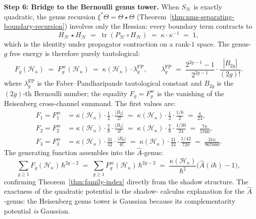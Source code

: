 \begin{computation}
\medskip
\noindent\textbf{Step 6: Bridge to the Bernoulli genus tower.}
When $S_{\mathcal{H}}$ is exactly quadratic, the genus recursion
$\xi^*\Theta = \Theta \star \Theta$
(Theorem~\ref{thm:nms-separating-boundary-recursion}) involves only
the Hessian: every boundary term contracts to
\begin{equation}\label{eq:heisenberg-hessian-contraction}
 H_{\mathcal{H}} \star H_{\mathcal{H}}
 \;=\;
 \operatorname{tr}(P_{\mathcal{H}} \circ H_{\mathcal{H}})
 \;=\;
 \kappa \cdot \kappa^{-1}
 \;=\; 1,
\end{equation}
which is the identity under propagator contraction on a rank-$1$
space. The genus-$g$ free energy is therefore purely tautological:
\begin{equation}\label{eq:heisenberg-genus-g-tautological}
 F_g(\mathcal{H}_\kappa)
 \;=\;
 F_g^{\mathrm{sc}}(\mathcal{H}_\kappa)
 \;=\;
 \kappa(\mathcal{H}_\kappa) \cdot \lambda_g^{\mathrm{FP}},
 \qquad
 \lambda_g^{\mathrm{FP}}
 \;=\;
 \frac{2^{2g-1}-1}{2^{2g-1}} \cdot \frac{|B_{2g}|}{(2g)!}.
\end{equation}
where $\lambda_g^{\mathrm{FP}}$ is the Faber--Pandharipande
tautological constant and $B_{2g}$ is the $(2g)$-th Bernoulli
number; the equality \(F_g=F_g^{\mathrm{sc}}\) is the vanishing of the
Heisenberg cross-channel summand. The first values are:
\begin{align}
 \label{eq:heisenberg-F1-shadow}
 F_1=F_1^{\mathrm{sc}}
 &=
 \kappa(\mathcal H_\kappa)\cdot \frac{1}{2} \cdot \frac{|B_2|}{2!}
 \;=\; \kappa(\mathcal H_\kappa)\cdot \frac{1}{2} \cdot \frac{1/6}{2}
 \;=\; \frac{\kappa}{24},\\[4pt]
 \label{eq:heisenberg-F2-shadow}
 F_2=F_2^{\mathrm{sc}}
 &=
 \kappa(\mathcal H_\kappa)\cdot \frac{7}{8} \cdot \frac{|B_4|}{4!}
 \;=\; \kappa(\mathcal H_\kappa)\cdot \frac{7}{8} \cdot \frac{1/30}{24}
 \;=\; \frac{7\kappa}{5760},\\[4pt]
 \label{eq:heisenberg-F3-shadow}
 F_3=F_3^{\mathrm{sc}}
 &=
 \kappa(\mathcal H_\kappa)\cdot \frac{31}{32} \cdot \frac{|B_6|}{6!}
 \;=\; \kappa(\mathcal H_\kappa)\cdot \frac{31}{32} \cdot \frac{1/42}{720}
 \;=\; \frac{31\kappa}{967680}.
\end{align}
The generating function assembles into the $\hat{A}$-genus:
\begin{equation}\label{eq:heisenberg-ahat-from-shadows}
 \sum_{g \ge 1} F_g(\mathcal{H}_\kappa)\,\hbar^{2g-2}
 \;=\;
 \sum_{g \ge 1} F_g^{\mathrm{sc}}(\mathcal{H}_\kappa)\,\hbar^{2g-2}
 \;=\;
 \frac{\kappa(\mathcal H_\kappa)}{\hbar^2}
 \bigl(\hat{A}(i\hbar) - 1\bigr),
\end{equation}
confirming Theorem~\ref{thm:family-index} directly from the shadow
structure. The exactness of the quadratic potential is the shadow-
calculus explanation for the $\hat{A}$-genus: the Heisenberg genus
tower is Gaussian because its complementarity potential \emph{is}
Gaussian.
\end{computation}

